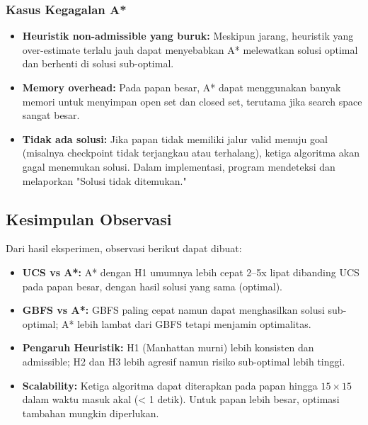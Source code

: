 \subsubsection{Kasus Kegagalan A*}
\begin{itemize}
    \item \textbf{Heuristik non-admissible yang buruk:} Meskipun jarang, heuristik yang over-estimate terlalu jauh dapat menyebabkan A* melewatkan solusi optimal dan berhenti di solusi sub-optimal.
    \item \textbf{Memory overhead:} Pada papan besar, A* dapat menggunakan banyak memori untuk menyimpan open set dan closed set, terutama jika search space sangat besar.
    \item \textbf{Tidak ada solusi:} Jika papan tidak memiliki jalur valid menuju goal (misalnya checkpoint tidak terjangkau atau terhalang), ketiga algoritma akan gagal menemukan solusi. Dalam implementasi, program mendeteksi dan melaporkan "Solusi tidak ditemukan."
\end{itemize}

\subsection{Kesimpulan Observasi}

Dari hasil eksperimen, observasi berikut dapat dibuat:
\begin{itemize}
    \item \textbf{UCS vs A*:} A* dengan H1 umumnya lebih cepat 2--5x lipat dibanding UCS pada papan besar, dengan hasil solusi yang sama (optimal).
    \item \textbf{GBFS vs A*:} GBFS paling cepat namun dapat menghasilkan solusi sub-optimal; A* lebih lambat dari GBFS tetapi menjamin optimalitas.
    \item \textbf{Pengaruh Heuristik:} H1 (Manhattan murni) lebih konsisten dan admissible; H2 dan H3 lebih agresif namun risiko sub-optimal lebih tinggi.
    \item \textbf{Scalability:} Ketiga algoritma dapat diterapkan pada papan hingga $15 \times 15$ dalam waktu masuk akal (< 1 detik). Untuk papan lebih besar, optimasi tambahan mungkin diperlukan.
\end{itemize}